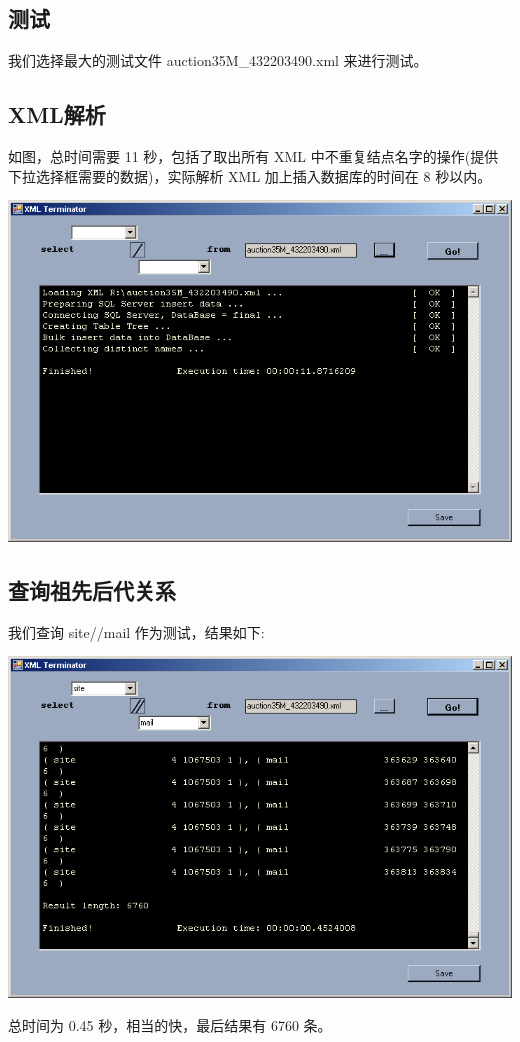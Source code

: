 \documentclass[10pt]{article}
\begin{document}
\begin{CJK}{UTF8}{gbsn}
\section{测试}
我们选择最大的测试文件 auction35M\_432203490.xml 来进行测试。

\subsection{XML解析}
如图，总时间需要 11 秒，包括了取出所有 XML 中不重复结点名字的操作(提供下拉选择框需要的数据)，实际解析 XML 
加上插入数据库的时间在 8 秒以内。
\begin{center}
\includegraphics[width=0.9\linewidth]{load35.png}
\end{center}

\subsection{查询祖先后代关系}
我们查询 site//mail 作为测试，结果如下:\\
\begin{center}
\includegraphics[width=0.9\linewidth]{test35_sitemail_time.png}
\end{center}
总时间为 0.45 秒，相当的快，最后结果有 6760 条。


\end{CJK}
\end{document}
